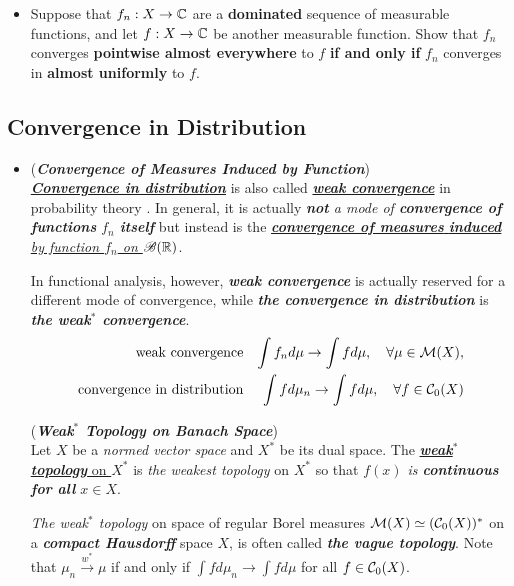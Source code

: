\documentclass[11pt]{article}
\begin{document}
\begin{itemize}
\item \begin{proposition}
Suppose that $f_n : X \rightarrow {\mathbb C}$ are a \textbf{dominated} sequence of measurable functions, and let $f : X \rightarrow {\mathbb C}$  be another measurable function. Show that $f_n$ converges \textbf{pointwise almost everywhere} to $f$ \textbf{if and only if} $f_n$ converges in \textbf{almost uniformly} to $f$.
\end{proposition}
\end{itemize}

\subsection{Convergence in Distribution}
\begin{itemize}
\item \begin{remark} (\emph{\textbf{Convergence of Measures Induced by Function}})\\
\underline{\emph{\textbf{Convergence in distribution}}} is also called \underline{\emph{\textbf{weak convergence}}} in probability theory \citep{folland2013real}. In general,  it is actually \emph{\textbf{not} a mode of \textbf{convergence of functions} $f_n$ \textbf{itself}} but instead is the \underline{\emph{\textbf{convergence of measures} \textbf{induced} by function $f_n$ on ${\mathscr B}({\mathbb R})$}}.

In functional analysis, however, \emph{\textbf{weak convergence}} is actually reserved for a different mode of convergence, while \emph{\textbf{the convergence in distribution}} is \emph{\textbf{the weak$^*$ convergence}}.
\begin{align*}
 \text{weak convergence} && \int f_n d\mu \rightarrow \int f d\mu, \quad \forall \mu \in {\mathcal M}(X), \\
\text{convergence in distribution}  &&  \int f d\mu_n \rightarrow \int f d\mu, \quad \forall f \in {\mathcal C}_{0}(X)
\end{align*}

 \begin{definition}  (\textbf{\emph{Weak$^{*}$ Topology on Banach Space}})\\
Let $X$ be a \emph{normed vector space} and $X^{*}$ be its dual space. The \underline{\emph{\textbf{weak$^{*}$ topology}} on $X^{*}$} is \emph{the weakest topology} on $X^{*}$ so that \emph{$f(x)$ is \textbf{continuous} \textbf{for all} $x \in X$}.
\end{definition}

\emph{The weak$^{*}$ topology} on space of regular Borel measures ${\mathcal M}(X) \simeq ({\mathcal C}_{0}(X))^{*}$ on a \emph{\textbf{compact Hausdorff}} space $X$, is often called \emph{\textbf{the vague topology}}. Note that $\mu_n \stackrel{w^{*}}{\rightarrow} \mu$ if and only if $\int f d\mu_n \rightarrow \int f d\mu$ for all $f \in {\mathcal C}_0(X)$. 
\end{remark}


\end{itemize}
\end{document}
